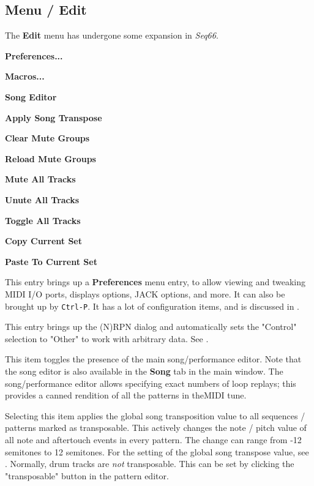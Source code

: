 \subsection{Menu / Edit}
\label{subsec:menu_edit}

   The \textbf{Edit} menu has undergone some expansion in \textsl{Seq66}.

   \begin{enumber}
      \item \textbf{Preferences...}
      \item \textbf{Macros...}
      \item \textbf{Song Editor}
      \item \textbf{Apply Song Transpose}
      \item \textbf{Clear Mute Groups}
      \item \textbf{Reload Mute Groups}
      \item \textbf{Mute All Tracks}
      \item \textbf{Unute All Tracks}
      \item \textbf{Toggle All Tracks}
      \item \textbf{Copy Current Set}
      \item \textbf{Paste To Current Set}
   \end{enumber}

   \setcounter{ItemCounter}{0}      %

   This entry brings up a \textbf{Preferences} menu entry,
   to allow viewing and tweaking MIDI I/O ports, displays options, JACK
   options, and more.
   It can also be brought up by \texttt{Ctrl-P}.
   It has a lot of configuration items, and is
   discussed in .

   This entry brings up the (N)RPN dialog and automatically sets
   the "Control" selection to "Other" to work with arbitrary data.
   See .

   This item toggles the presence of the main song/performance editor.
   Note that the song editor is also available in the
   \textbf{Song} tab in the main window.
   The song/performance editor allows specifying exact numbers of loop replays;
   this provides a canned rendition of all the patterns in theMIDI tune.

   Selecting this item applies the global song transposition value to
   all sequences / patterns marked as transposable.
   This actively changes the note / pitch value of all note and aftertouch
   events in every pattern.
   The change can range from -12 semitones to 12 semitones.
   For the setting of the global song transpose value, see
   .
   Normally, drum tracks are \textsl{not} transposable.
   This can be set by clicking the "transposable" button in the
   pattern editor.

